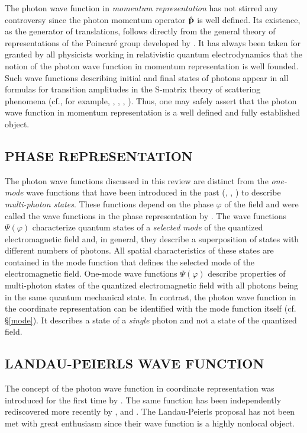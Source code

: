 \documentclass{article}
\begin{document}
The photon wave function in {\em momentum representation} has not stirred
any controversy since the photon momentum operator $\hat{\bf p}$ is well defined. Its
existence, as the generator of translations, follows directly from the
general theory of representations of the Poincar\'e group developed by
\cite{Wigner_39}. It has always been taken for granted by all physicists
working in relativistic quantum electrodynamics that the notion of the
photon wave function in momentum representation is well founded. Such wave
functions describing initial and final states of photons appear in all
formulas for transition amplitudes in the S-matrix theory of scattering
phenomena (cf., for example, \cite{Schweber_61}, \cite{AB_65},
\cite{BBBB_75}, \cite{CDG_89}). Thus, one may safely assert that the photon
wave function in momentum representation is a well defined and fully
established object.

\subsection{PHASE REPRESENTATION}

The photon wave functions discussed in this review are distinct from the
{\em one-mode} wave functions that have been introduced in the past
(\cite{London_27}, \cite{BBBB_76}, \cite{PB_88}) to describe {\em multi-photon
states}. These functions depend on the phase $\varphi$ of the field and were
called the wave functions in the phase representation by \cite{BBBB_76}. The
wave functions $\Psi(\varphi)$ characterize quantum states of a {\em
selected mode} of the quantized electromagnetic field and, in general, they
describe a superposition of states with different numbers of photons. All
spatial characteristics of these states are contained in the mode function
that defines the selected mode of the electromagnetic field. One-mode wave
functions $\Psi(\varphi)$ describe properties of multi-photon states of the
quantized electromagnetic field with all photons being in the same quantum mechanical state. In contrast, the photon wave function in the coordinate representation can be
identified with the mode function itself (cf. \S \ref{mode}). It describes a
state of a {\em single} photon and not a state of the quantized field.

\subsection{LANDAU-PEIERLS WAVE FUNCTION}

The concept of the photon wave function in coordinate representation was
introduced for the first time by \cite{LP_30}. The same function has been
independently rediscovered more recently by \cite{Cook_82a, Cook_82b}, and
\cite{Inagaki_94}. The Landau-Peierls proposal has not been met with great
enthusiasm since their wave function is a highly nonlocal object.
\end{document}
